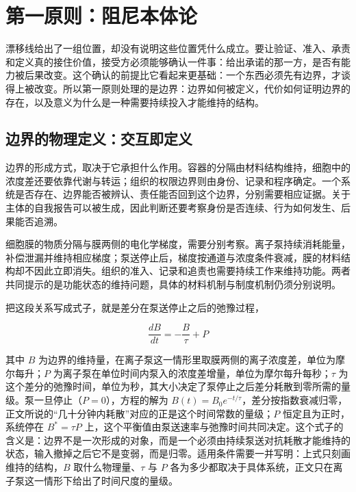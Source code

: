 \section{第一原则：阻尼本体论}

漂移线给出了一组位置，却没有说明这些位置凭什么成立。要让验证、准入、承责和定义真的接住价值，接受方必须能够确认一件事：给出承诺的那一方，是否有能力被后果改变。这个确认的前提比它看起来更基础：一个东西必须先有边界，才谈得上被改变。所以第一原则处理的是边界：边界如何被定义，代价如何证明边界的存在，以及意义为什么是一种需要持续投入才能维持的结构。

\subsection{边界的物理定义：交互即定义}

边界的形成方式，取决于它承担什么作用。容器的分隔由材料结构维持，细胞中的浓度差还要依靠代谢与转运；组织的权限边界则由身份、记录和程序确定。一个系统是否存在、边界能否被辨认、责任能否回到这个边界，分别需要相应证据。关于主体的自我报告可以被生成，因此判断还要考察身份是否连续、行为如何发生、后果能否追溯。


细胞膜的物质分隔与膜两侧的电化学梯度，需要分别考察。离子泵持续消耗能量，补偿泄漏并维持相应梯度；泵送停止后，梯度按通道与浓度条件衰减，膜的材料结构却不因此立即消失。组织的准入、记录和追责也需要持续工作来维持功能。两者共同提示的是功能状态的维持问题，具体的材料机制与制度机制仍须分别说明。

把这段关系写成式子，就是差分在泵送停止之后的弛豫过程，

\begin{equation}
\frac{dB}{dt}=-\frac{B}{\tau}+P
\end{equation}

其中 $B$ 为边界的维持量，在离子泵这一情形里取膜两侧的离子浓度差，单位为摩尔每升；$P$ 为离子泵在单位时间内泵入的浓度差增量，单位为摩尔每升每秒；$\tau$ 为这个差分的弛豫时间，单位为秒，其大小决定了泵停止之后差分耗散到零所需的量级。泵一旦停止（$P=0$），方程的解为 $B(t)=B_0e^{-t/\tau}$，差分按指数衰减归零，正文所说的“几十分钟内耗散”对应的正是这个时间常数的量级；$P$ 恒定且为正时，系统停在 $B^{*}=\tau P$ 上，这个平衡值由泵送速率与弛豫时间共同决定。这个式子的含义是：边界不是一次形成的对象，而是一个必须由持续泵送对抗耗散才能维持的状态，输入撤掉之后它不是变弱，而是归零。适用条件需要一并写明：上式只刻画维持的结构，$B$ 取什么物理量、$\tau$ 与 $P$ 各为多少都取决于具体系统，正文只在离子泵这一情形下给出了时间尺度的量级。

